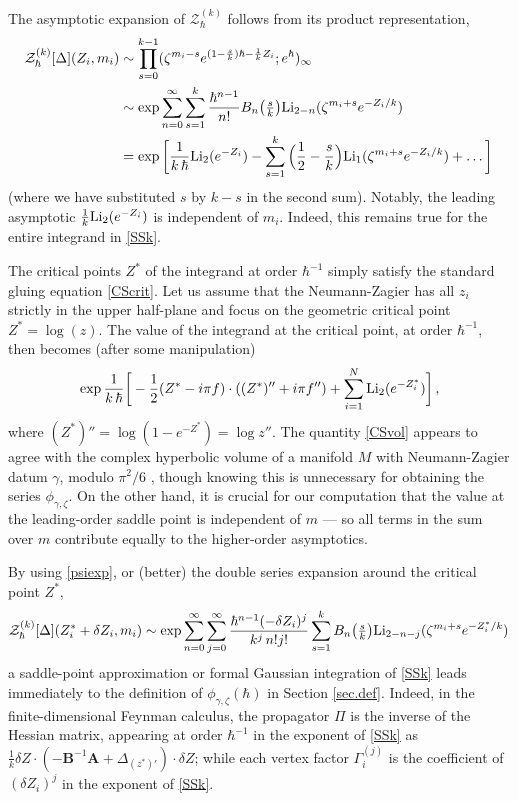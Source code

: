 \documentclass[12pt]{amsart}
\theoremstyle{definition}
\def\be{  \begin{equation} }
\def\ee{  \end{equation} }
\newcommand{\CZ}{\mathcal{Z}}
\newcommand{\Li}{{\rm Li}}
\newcommand{\mb}{\mathbf}
\begin{document}
The asymptotic expansion of $\CZ_\hbar^{(k)}$ follows from its product 
representation,
%
\begin{align} 
\label{psiexp}
\CZ_\hbar^{(k)}[\Delta](Z_i,m_i)  &\sim \prod_{s=0}^{k-1} 
(\zeta^{m_i-s}e^{(1-\frac sk)\hbar-\frac1kZ_i};e^\hbar)_\infty  \notag \\ &
\sim \exp\sum_{n=0}^\infty\sum_{s=1}^{k} \frac{\hbar^{n-1}}{n!}B_n
\big(\tfrac sk\big) \Li_{2-n}(\zeta^{m_i+s}e^{-Z_i/k}) \\ 
& =  \exp\bigg[\frac1{k\,\hbar}\Li_2(e^{-Z_i}) - \sum_{s=1}^{k}
\Big(\frac12-\frac sk\Big)\Li_1(\zeta^{m_i+s}e^{-Z_i/k}) + \ldots\bigg]\, \notag
\end{align}
%
(where we have substituted $s$ by $k-s$ in the second sum).
Notably, the leading asymptotic $\frac1k\Li_2(e^{-Z_i})$ is independent of 
$m_i$. Indeed, this remains true for the entire integrand in \eqref{SSk}.

The critical points $Z^*$ of the integrand at order $\hbar^{-1}$ simply 
satisfy the standard gluing equation \eqref{CScrit}. Let us assume that the 
Neumann-Zagier has all $z_i$ strictly in the upper half-plane and focus on 
the geometric critical point $Z^* = \log(z)$. The value of the integrand at 
the critical point, at order $\hbar^{-1}$, then becomes (after some 
manipulation)
%
\be 
\exp\frac1 {k\,\hbar}\bigg[-\frac12(Z^*-i\pi f)\cdot((Z^*)''+i\pi f'') 
+ \sum_{i=1}^N \Li_2(e^{-Z_i^*})\bigg]\,, \label{CSvol} 
\ee
%
where $(Z^*)'' = \log(1-e^{-Z^*}) = \log z''$.
The quantity \eqref{CSvol} appears to agree with the complex hyperbolic 
volume of a manifold $M$ with Neumann-Zagier datum $\gamma$, modulo 
$\pi^2/6$ \cite{DG}, though knowing this is unnecessary for obtaining the 
series $\phi_{\gamma,\zeta}$. On the other hand, it is crucial for 
our computation that the value at the leading-order saddle point is 
independent of $m$ --- so all terms in the sum over $m$ contribute equally 
to the higher-order asymptotics.

By using \eqref{psiexp}, or (better) the double series expansion around the 
critical point $Z^*$,
%
\be 
\CZ_\hbar^{(k)}[\Delta](Z_i^*+\delta Z_i,m_i) \sim \exp \sum_{n=0}^\infty
\sum_{j=0}^\infty \frac{\hbar^{n-1}(-\delta Z_i)^j}{k^j\,n! j!} 
\sum_{s=1}^k B_n\big(\tfrac sk\big) \Li_{2-n-j}(\zeta^{m_i+s}e^{-Z_i^*/k})\, 
\ee
%
a saddle-point approximation or formal Gaussian integration of \eqref{SSk} 
leads immediately to the definition of $\phi_{\gamma,\zeta}(\hbar)$ in Section 
\ref{sec.def}. Indeed, in the finite-dimensional Feynman calculus, the 
propagator $\Pi$ is the inverse of the Hessian matrix, appearing at order 
$\hbar^{-1}$ in the exponent of \eqref{SSk} as 
$\frac1k \delta Z\cdot(-\mb B^{-1}\mb A+\Delta_{(z^*)'})\cdot \delta Z$; 
while each vertex factor $\Gamma_i^{(j)}$ is the coefficient of 
$(\delta Z_i)^j$ in the exponent of \eqref{SSk}.
\end{document}
